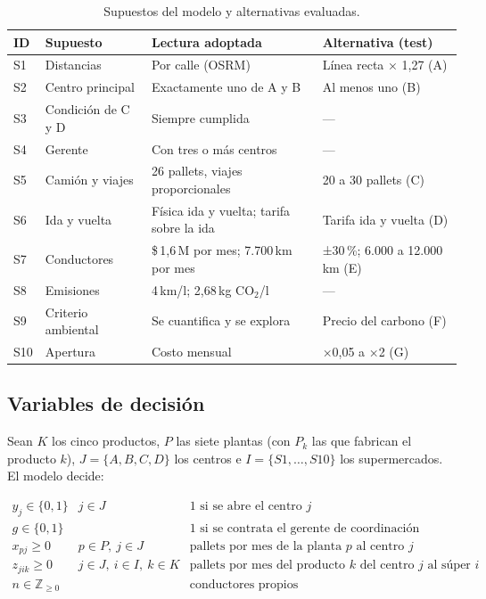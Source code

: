 \documentclass[10pt,a4paper]{article}
\begin{document}
\begin{table}[H]
\centering\small
\caption{Supuestos del modelo y alternativas evaluadas.}
\label{tab:supuestos}
\begin{tabularx}{\linewidth}{@{}llXl@{}}
\toprule
\textbf{ID} & \textbf{Supuesto} & \textbf{Lectura adoptada} & \textbf{Alternativa (test)} \\
\midrule
S1 & Distancias              & Por calle (OSRM)                          & Línea recta × 1,27 (A) \\
S2 & Centro principal        & Exactamente uno de A y B                  & Al menos uno (B) \\
S3 & Condición de C y D      & Siempre cumplida                          & --- \\
S4 & Gerente                 & Con tres o más centros                    & --- \\
S5 & Camión y viajes         & 26 pallets, viajes proporcionales         & 20 a 30 pallets (C) \\
S6 & Ida y vuelta            & Física ida y vuelta; tarifa sobre la ida  & Tarifa ida y vuelta (D) \\
S7 & Conductores             & \$\,1,6\,M por mes; 7.700\,km por mes     & ±30\,\%; 6.000 a 12.000\,km (E) \\
S8 & Emisiones               & 4\,km/l; 2,68\,kg CO$_2$/l                & --- \\
S9 & Criterio ambiental      & Se cuantifica y se explora                & Precio del carbono (F) \\
S10 & Apertura               & Costo mensual                             & ×0,05 a ×2 (G) \\
\bottomrule
\end{tabularx}
\end{table}

\subsection{Variables de decisión}
\label{sec:variables}

Sean $K$ los cinco productos, $P$ las siete plantas (con $P_k$ las que fabrican
el producto $k$), $J = \{A, B, C, D\}$ los centros e $I = \{S1, \dots, S10\}$
los supermercados. El modelo decide:

\[
\begin{array}{lll}
y_j \in \{0,1\}       & j \in J              & \text{1 si se abre el centro } j \\[2pt]
g \in \{0,1\}         &                      & \text{1 si se contrata el gerente de coordinación} \\[2pt]
x_{pj} \geq 0         & p \in P,\ j \in J    & \text{pallets por mes de la planta } p \text{ al centro } j \\[2pt]
z_{jik} \geq 0        & j \in J,\ i \in I,\ k \in K & \text{pallets por mes del producto } k \text{ del centro } j \text{ al súper } i \\[2pt]
n \in \mathbb{Z}_{\geq 0} &                  & \text{conductores propios}
\end{array}
\]
\end{document}
